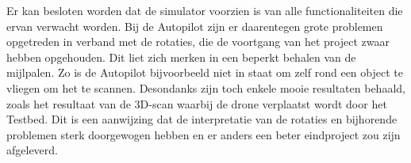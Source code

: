 Er kan besloten worden dat de simulator voorzien is van alle functionaliteiten die ervan verwacht worden. Bij de Autopilot zijn er daarentegen grote problemen opgetreden in verband met de rotaties, die de voortgang van het project zwaar hebben opgehouden. Dit liet zich merken in een beperkt behalen van de mijlpalen. Zo is de Autopilot bijvoorbeeld niet in staat om zelf rond een object te vliegen om het te scannen. Desondanks zijn toch enkele mooie resultaten behaald, zoals het resultaat van de 3D-scan waarbij de drone verplaatst wordt door het Testbed. Dit is een aanwijzing dat de interpretatie van de rotaties en bijhorende problemen sterk doorgewogen hebben en er anders een beter eindproject zou zijn afgeleverd. 